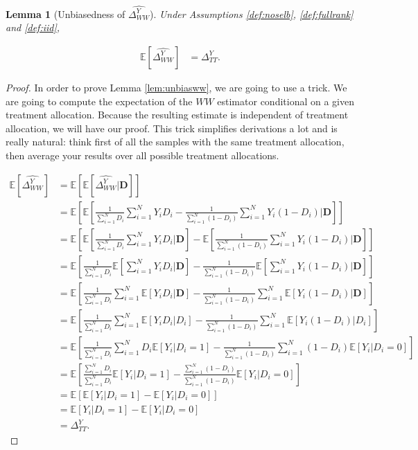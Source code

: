 \documentclass[
]{book}
\newcommand{\esp}[1]{\mathbb{E}[ #1 ]}
\newtheorem{lemma}{Lemma}[chapter]
\theoremstyle{definition}
\theoremstyle{definition}
\theoremstyle{definition}
\theoremstyle{definition}
\theoremstyle{remark}
\begin{document}
\begin{lemma}[Unbiasedness of $\hat{\Delta^Y_{WW}}$]
\protect\hypertarget{lem:unbiasww}{}{\label{lem:unbiasww} \iffalse (Unbiasedness of \(\hat{\Delta^Y_{WW}}\)) \fi{} }Under Assumptions \ref{def:noselb}, \ref{def:fullrank} and \ref{def:iid},

\begin{align*}
\esp{\hat{\Delta^Y_{WW}}}& = \Delta^Y_{TT}.
\end{align*}
\end{lemma}

\begin{proof}
\iffalse{} {Proof. } \fi{}In order to prove Lemma \ref{lem:unbiasww}, we are going to use a trick.
We are going to compute the expectation of the \(WW\) estimator conditional on a given treatment allocation.
Because the resulting estimate is independent of treatment allocation, we will have our proof.
This trick simplifies derivations a lot and is really natural: think first of all the samples with the same treatment allocation, then average your results over all possible treatment allocations.

\begin{align*}
\esp{\hat{\Delta^Y_{WW}}} & = \esp{\esp{\hat{\Delta^Y_{WW}}|\mathbf{D}}}\\
                          & = \esp{\esp{\frac{1}{\sum_{i=1}^N D_i}\sum_{i=1}^N Y_iD_i-\frac{1}{\sum_{i=1}^N (1-D_i)}\sum_{i=1}^N Y_i(1-D_i)|\mathbf{D}}}\\
                          & = \esp{\esp{\frac{1}{\sum_{i=1}^N D_i}\sum_{i=1}^N Y_iD_i|\mathbf{D}}-\esp{\frac{1}{\sum_{i=1}^N (1-D_i)}\sum_{i=1}^N Y_i(1-D_i)|\mathbf{D}}}\\
                          & = \esp{\frac{1}{\sum_{i=1}^N D_i}\esp{\sum_{i=1}^N Y_iD_i|\mathbf{D}}-\frac{1}{\sum_{i=1}^N (1-D_i)}\esp{\sum_{i=1}^N Y_i(1-D_i)|\mathbf{D}}}\\
                          & = \esp{\frac{1}{\sum_{i=1}^N D_i}\sum_{i=1}^N \esp{Y_iD_i|\mathbf{D}}-\frac{1}{\sum_{i=1}^N (1-D_i)}\sum_{i=1}^N \esp{Y_i(1-D_i)|\mathbf{D}}}\\
                          & = \esp{\frac{1}{\sum_{i=1}^N D_i}\sum_{i=1}^N \esp{Y_iD_i|D_i}-\frac{1}{\sum_{i=1}^N (1-D_i)}\sum_{i=1}^N \esp{Y_i(1-D_i)|D_i}}\\
                          & = \esp{\frac{1}{\sum_{i=1}^N D_i}\sum_{i=1}^N D_i\esp{Y_i|D_i=1}-\frac{1}{\sum_{i=1}^N (1-D_i)}\sum_{i=1}^N(1-D_i)\esp{Y_i|D_i=0}}\\
                          & = \esp{\frac{\sum_{i=1}^N D_i}{\sum_{i=1}^N D_i}\esp{Y_i|D_i=1}-\frac{\sum_{i=1}^N(1-D_i)}{\sum_{i=1}^N (1-D_i)}\esp{Y_i|D_i=0}}\\
                          & = \esp{\esp{Y_i|D_i=1}-\esp{Y_i|D_i=0}}\\
                          & = \esp{Y_i|D_i=1}-\esp{Y_i|D_i=0} \\
                          & = \Delta^Y_{TT}.
\end{align*}


\end{proof}
\end{document}
